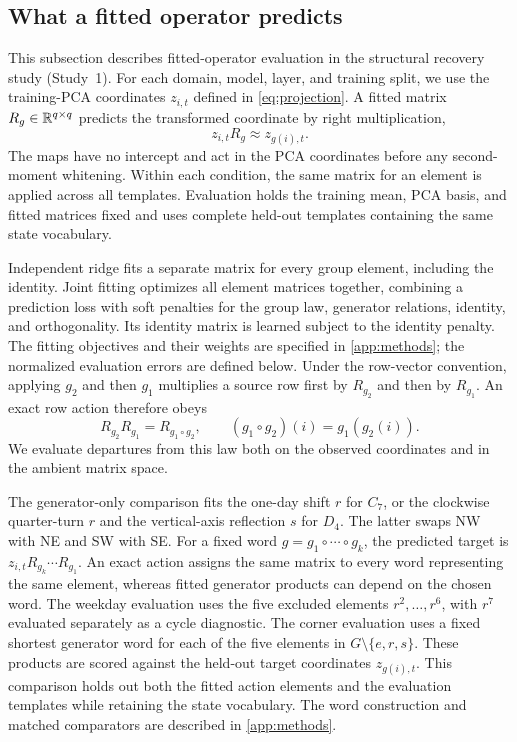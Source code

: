 \subsection{What a fitted operator predicts}

This subsection describes fitted-operator evaluation in the
structural recovery study (Study~1).
For each domain, model, layer, and training split, we use the
training-PCA coordinates $z_{i,t}$ defined in
\cref{eq:projection}.
A fitted matrix $R_g\in\mathbb{R}^{q\times q}$ predicts the transformed
coordinate by right multiplication,
\begin{equation}
 z_{i,t}R_g\approx z_{g(i),t}.
 \label{eq:prediction}
\end{equation}
The maps have no intercept and act in the PCA coordinates
before any second-moment whitening.
Within each condition, the same matrix for an element is
applied across all templates.
Evaluation holds the training mean, PCA basis, and fitted
matrices fixed and uses complete held-out templates containing
the same state vocabulary.

Independent ridge fits a separate matrix for every group
element, including the identity.
Joint fitting optimizes all element matrices together,
combining a prediction loss with soft penalties for the
group law, generator relations, identity, and orthogonality.
Its identity matrix is learned subject to the identity penalty.
The fitting objectives and their weights are specified in
\cref{app:methods}; the normalized evaluation errors are
defined below.
Under the row-vector convention, applying $g_2$ and then $g_1$
multiplies a source row first by $R_{g_2}$ and then by $R_{g_1}$.
An exact row action therefore obeys
\begin{equation}
 R_{g_2}R_{g_1}=R_{g_1\circ g_2},
 \qquad
 (g_1\circ g_2)(i)=g_1(g_2(i)).
 \label{eq:convention}
\end{equation}
We evaluate departures from this law both on the observed
coordinates and in the ambient matrix space.

The generator-only comparison fits the one-day shift $r$
for $C_7$, or the clockwise quarter-turn $r$ and the
vertical-axis reflection $s$ for $D_4$.
The latter swaps NW with NE and SW with SE.
For a fixed word $g=g_1\circ\cdots\circ g_k$, the predicted
target is $z_{i,t}R_{g_k}\cdots R_{g_1}$.
An exact action assigns the same matrix to every word
representing the same element, whereas fitted generator
products can depend on the chosen word.
The weekday evaluation uses the five excluded elements
$r^2,\ldots,r^6$, with $r^7$ evaluated separately as a
cycle diagnostic.
The corner evaluation uses a fixed shortest generator word
for each of the five elements in $G\setminus\{e,r,s\}$.
These products are scored against the held-out target
coordinates $z_{g(i),t}$.
This comparison holds out both the fitted action elements
and the evaluation templates while retaining the state
vocabulary.
The word construction and matched comparators are described
in \cref{app:methods}.

